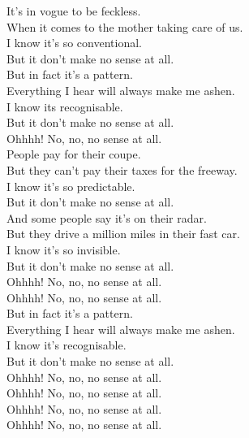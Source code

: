 
\label{album:paper-mache-dream-balloon}




It's in vogue to be feckless. \\
When it comes to the mother taking care of us. \\
I know it's so conventional. \\
But it don't make no sense at all. \\

But in fact it's a pattern. \\
Everything I hear will always make me ashen. \\
I know its recognisable. \\
But it don't make no sense at all. \\

Ohhhh! No, no, no sense at all. \\

People pay for their coupe. \\
But they can't pay their taxes for the freeway. \\
I know it's so predictable. \\
But it don't make no sense at all. \\

And some people say it's on their radar. \\
But they drive a million miles in their fast car. \\
I know it's so invisible. \\
But it don't make no sense at all. \\

Ohhhh! No, no, no sense at all. \\
Ohhhh! No, no, no sense at all. \\


But in fact it's a pattern. \\
Everything I hear will always make me ashen. \\
I know it's recognisable. \\
But it don't make no sense at all. \\

Ohhhh! No, no, no sense at all. \\
Ohhhh! No, no, no sense at all. \\
Ohhhh! No, no, no sense at all. \\
Ohhhh! No, no, no sense at all. \\


